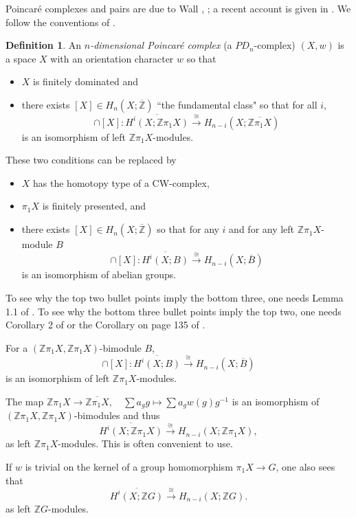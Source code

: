 \documentclass[12pt]{amsart}
\theoremstyle{definition}
\newtheorem{definition}[theorem]{Definition}
\newcommand{\Z}{\mathbb Z}
\newcommand{\ol}[1]{{\overline{#1}}}
\newcommand{\zpx}{\Z\pi_1X}
\begin{document}
  



Poincar\'e complexes and pairs are due to Wall \cite{Wall_P}, \cite{Wall_S}; a recent account is given in \cite{KQS}.   We follow the conventions of \cite{Hi20}.


\begin{definition}
 An {\em $n$-dimensional Poincar\'e complex} (a $PD_n$-complex) $(X,w)$ is a space $X$ with an orientation character $w$ so that
 
\begin{itemize}
 \item $X$ is finitely dominated and
 \item there exists  $[X] \in H_n(X; \ol \Z)$ ``the fundamental class" so that for all $i$,
 $$
 \cap [X] : \ol{H^i(X; \zpx)} \xrightarrow{\cong} H_{n-i}(X; \ol{\zpx}) 
 $$
 is an isomorphism of left $\Z\pi_1X$-modules.
\end{itemize}
\end{definition}

These two conditions can be replaced by 
\begin{itemize}
 \item $X$ has the homotopy type of a CW-complex, 
 \item $\pi_1X$ is finitely presented, and 
 \item there exists  $[X] \in H_n(X; \ol \Z)$ so that for any $i$ and for any left $\Z\pi_1X$-module $B$
 $$
 \cap [X] : \ol{H^i(X; B)} \xrightarrow{\cong} H_{n-i}(X; \ol{B})
 $$
 is an isomorphism of abelian groups.
\end{itemize}
To see why the top two bullet points imply the bottom three, one needs Lemma 1.1 of \cite{Wall_P}.  To see why the bottom three bullet points imply the top two, one needs Corollary 2 of \cite{Browder} or the Corollary on page 135 of \cite{Brown75}.


For a $(\Z\pi_1X,\Z\pi_1X)$-bimodule $B$, 
 $$
 \cap [X] : \ol{H^i(X; B)} \xrightarrow{\cong} H_{n-i}(X; \ol{B}) 
 $$
is an isomorphism of  left $\Z\pi_1X$-modules.

The map $\Z\pi_1X \to \ol{\Z\pi_1X}, \quad \sum a_g g \mapsto \sum a_g w(g) g^{-1}$ is an isomorphism of  $(\Z\pi_1X,\Z\pi_1X)$-bimodules and thus
$$
\ol{H^i(X; \zpx)} \xrightarrow{\cong} H_{n-i}(X; \zpx), 
$$
as left $\Z\pi_1X$-modules.   This is often  convenient to use.


If $w$ is trivial on the kernel of a group homomorphism $\pi_1X \to G$, one also sees that 
$$
\ol{H^i(X; \Z G)} \xrightarrow{\cong} H_{n-i}(X; \Z G). 
$$
as left $\Z G$-modules.
\end{document}
